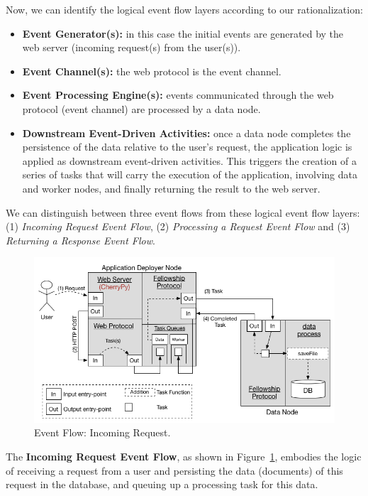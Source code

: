 \documentclass[12pt, titlepage]{uo_temp}
\begin{document}
     Now, we can identify the logical event flow layers according to our rationalization:
     \begin{itemize}
     \item \textbf{Event Generator(s):} in this case the initial events are generated by
       the web server (incoming request(s) from the user(s)).
     \item \textbf{Event Channel(s):} the web protocol is the event channel.
     \item \textbf{Event Processing Engine(s):} events communicated through the web
       protocol (event channel) are processed by a data node.
     \item \textbf{Downstream Event-Driven Activities:} once a data node completes the
       persistence of the data relative to the user's request, the application logic is
       applied as downstream event-driven activities. This triggers the creation of
       a series of tasks that will carry the execution of the application, involving data
       and worker nodes, and finally returning the result to the web server.
     \end{itemize}
     
     We can distinguish between three event flows from these logical event flow layers:
     (1) \emph{Incoming Request Event Flow}, (2) \emph{Processing a Request Event Flow}
     and (3) \emph{Returning a Response Event Flow}.

     \begin{figure}[h!]
       \centering
       \includegraphics[width=125mm]{images/ef1.png}
       \caption{Event Flow: Incoming Request.}
       \label{ef1}
     \end{figure}

     The \textbf{Incoming Request Event Flow}, as shown in Figure~\ref{ef1}, embodies the
     logic of receiving a request from a user and persisting the data (documents) of this
     request in the database, and queuing up a processing task for this data.
\end{document}
